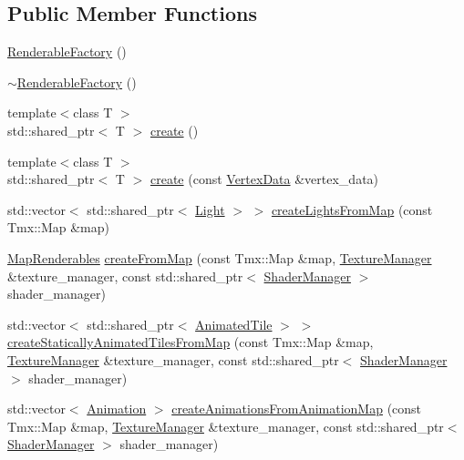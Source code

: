 \subsection*{Public Member Functions}
\begin{DoxyCompactItemize}
\item 
\hyperlink{class_graphics_1_1_renderable_factory_aa48147a2a3e11c1a03d1aed7b4b3889b}{Renderable\+Factory} ()
\item 
\hyperlink{class_graphics_1_1_renderable_factory_aed9ccae586d31d05b6c6a09a7bb37b44}{$\sim$\+Renderable\+Factory} ()
\item 
{\footnotesize template$<$class T $>$ }\\std\+::shared\+\_\+ptr$<$ T $>$ \hyperlink{class_graphics_1_1_renderable_factory_a732457c06858debc4870d7a77568d0dd}{create} ()
\item 
{\footnotesize template$<$class T $>$ }\\std\+::shared\+\_\+ptr$<$ T $>$ \hyperlink{class_graphics_1_1_renderable_factory_abaf13a568934efa1a785ed38622bcbbe}{create} (const \hyperlink{class_graphics_1_1_vertex_data}{Vertex\+Data} \&vertex\+\_\+data)
\item 
std\+::vector$<$ std\+::shared\+\_\+ptr$<$ \hyperlink{class_graphics_1_1_light}{Light} $>$ $>$ \hyperlink{class_graphics_1_1_renderable_factory_af1b3f07c26ee6aed903f3611a93a284d}{create\+Lights\+From\+Map} (const Tmx\+::\+Map \&map)
\item 
\hyperlink{struct_graphics_1_1_map_renderables}{Map\+Renderables} \hyperlink{class_graphics_1_1_renderable_factory_a06a17225aeaa74b05c6595e02c66c8d3}{create\+From\+Map} (const Tmx\+::\+Map \&map, \hyperlink{class_graphics_1_1_texture_manager}{Texture\+Manager} \&texture\+\_\+manager, const std\+::shared\+\_\+ptr$<$ \hyperlink{class_graphics_1_1_shader_manager}{Shader\+Manager} $>$ shader\+\_\+manager)
\item 
std\+::vector$<$ std\+::shared\+\_\+ptr$<$ \hyperlink{class_graphics_1_1_animated_tile}{Animated\+Tile} $>$ $>$ \hyperlink{class_graphics_1_1_renderable_factory_ab2c5c37f969c72c2554a9b19b7fe5a7a}{create\+Statically\+Animated\+Tiles\+From\+Map} (const Tmx\+::\+Map \&map, \hyperlink{class_graphics_1_1_texture_manager}{Texture\+Manager} \&texture\+\_\+manager, const std\+::shared\+\_\+ptr$<$ \hyperlink{class_graphics_1_1_shader_manager}{Shader\+Manager} $>$ shader\+\_\+manager)
\item 
std\+::vector$<$ \hyperlink{struct_graphics_1_1_animation}{Animation} $>$ \hyperlink{class_graphics_1_1_renderable_factory_a8143ae8f07bc174cab9da6f8b2250d3c}{create\+Animations\+From\+Animation\+Map} (const Tmx\+::\+Map \&map, \hyperlink{class_graphics_1_1_texture_manager}{Texture\+Manager} \&texture\+\_\+manager, const std\+::shared\+\_\+ptr$<$ \hyperlink{class_graphics_1_1_shader_manager}{Shader\+Manager} $>$ shader\+\_\+manager)

\end{DoxyCompactItemize}
